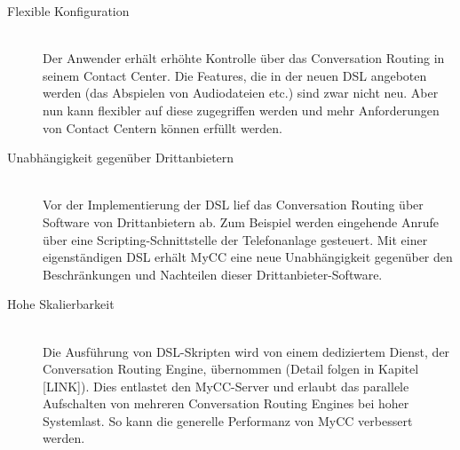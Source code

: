 \begin{description}
\item[Flexible Konfiguration] \hfill \\
Der Anwender erhält erhöhte Kontrolle über das Conversation Routing in seinem Contact Center. Die Features, die in der neuen DSL angeboten werden (das Abspielen von Audiodateien etc.) sind zwar nicht neu. Aber nun kann flexibler auf diese zugegriffen werden und mehr Anforderungen von Contact Centern können erfüllt werden.
\item[Unabhängigkeit gegenüber Drittanbietern] \hfill \\
Vor der Implementierung der DSL lief das Conversation Routing über Software von Drittanbietern ab. Zum Beispiel werden eingehende Anrufe über eine Scripting-Schnittstelle der Telefonanlage gesteuert. Mit einer eigenständigen DSL erhält MyCC eine neue Unabhängigkeit gegenüber den Beschränkungen und Nachteilen dieser Drittanbieter-Software.
\item[Hohe Skalierbarkeit] \hfill \\
Die Ausführung von DSL-Skripten wird von einem dediziertem Dienst, der Conversation Routing Engine, übernommen (Detail folgen in Kapitel [LINK]). Dies entlastet den MyCC-Server und erlaubt das parallele Aufschalten von mehreren Conversation Routing Engines bei hoher Systemlast. So kann die generelle Performanz von MyCC verbessert werden.
\end{description}

